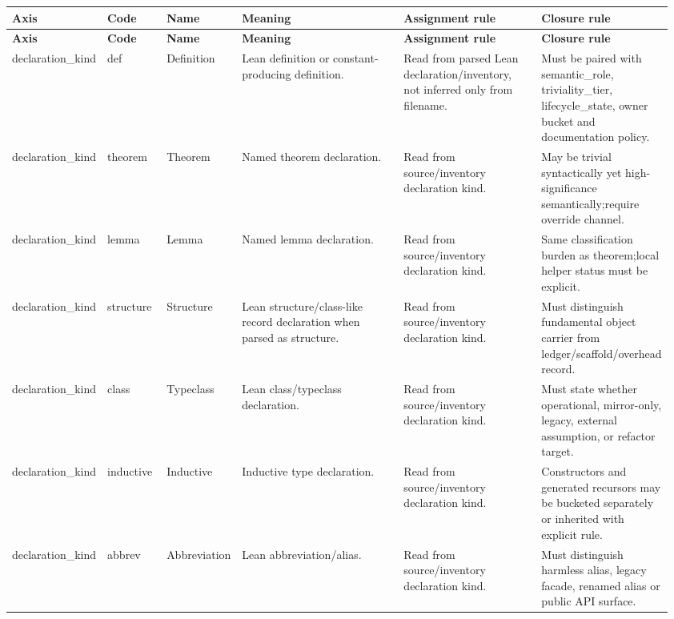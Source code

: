 \footnotesize
{}
\begin{longtable}{L{0.105\linewidth} L{0.095\linewidth} L{0.11\linewidth} L{0.255\linewidth} L{0.215\linewidth} L{0.185\linewidth}}
\hline
\textbf{Axis} & \textbf{Code} & \textbf{Name} & \textbf{Meaning} & \textbf{Assignment rule} & \textbf{Closure rule}\\
\hline
\endfirsthead
\hline
\textbf{Axis} & \textbf{Code} & \textbf{Name} & \textbf{Meaning} & \textbf{Assignment rule} & \textbf{Closure rule}\\
\hline
\endhead
declaration\_kind & def & Definition & Lean definition or constant-producing definition. & Read from parsed Lean declaration/\allowbreak{}inventory, not inferred only from filename. & Must be paired with semantic\_role, triviality\_tier, lifecycle\_state, owner bucket and documentation policy.\\
\hline
\addlinespace[0.24em]
declaration\_kind & theorem & Theorem & Named theorem declaration. & Read from source/\allowbreak{}inventory declaration kind. & May be trivial syntactically yet high-significance semantically;\newline require override channel.\\
\hline
\addlinespace[0.24em]
declaration\_kind & lemma & Lemma & Named lemma declaration. & Read from source/\allowbreak{}inventory declaration kind. & Same classification burden as theorem;\newline local helper status must be explicit.\\
\hline
\addlinespace[0.24em]
declaration\_kind & structure & Structure & Lean structure/\allowbreak{}class-like record declaration when parsed as structure. & Read from source/\allowbreak{}inventory declaration kind. & Must distinguish fundamental object carrier from ledger/\allowbreak{}scaffold/\allowbreak{}overhead record.\\
\hline
\addlinespace[0.24em]
declaration\_kind & class & Typeclass & Lean class/\allowbreak{}typeclass declaration. & Read from source/\allowbreak{}inventory declaration kind. & Must state whether operational, mirror-only, legacy, external assumption, or refactor target.\\
\hline
\addlinespace[0.24em]
declaration\_kind & inductive & Inductive & Inductive type declaration. & Read from source/\allowbreak{}inventory declaration kind. & Constructors and generated recursors may be bucketed separately or inherited with explicit rule.\\
\hline
\addlinespace[0.24em]
declaration\_kind & abbrev & Abbreviation & Lean abbreviation/\allowbreak{}alias. & Read from source/\allowbreak{}inventory declaration kind. & Must distinguish harmless alias, legacy facade, renamed alias or public API surface.\\

\end{longtable}
